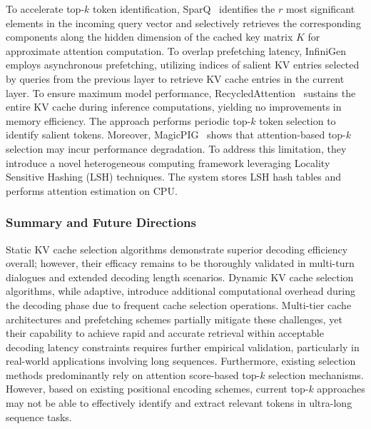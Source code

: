 To accelerate top-$k$ token identification, SparQ~\cite{DBLP:conf/icml/RibarCHBLO24} identifies 
the $r$ most significant elements in the incoming query vector and selectively retrieves 
the corresponding components along the hidden dimension of the cached key matrix $K$ for 
approximate attention computation.
To overlap prefetching latency, InfiniGen~\cite{lee2024infinigenefficientgenerativeinference} employs 
asynchronous prefetching, utilizing indices of salient KV entries selected by queries from 
the previous layer to retrieve KV cache entries in the current layer.
To ensure maximum model performance, RecycledAttention~\cite{xu2024recycledattentionefficientinference} sustains the 
entire KV cache during inference computations, yielding no improvements in memory efficiency. The approach performs periodic top-$k$ token selection to identify salient tokens.
Moreover, MagicPIG~\cite{DBLP:journals/corr/abs-2410-16179} shows that attention-based top-$k$ selection may incur performance degradation. 
To address this limitation, they introduce a novel heterogeneous computing framework leveraging Locality Sensitive Hashing (LSH) techniques. 
The system stores LSH hash tables and performs attention estimation on CPU.

\subsubsection{Summary and Future Directions} 
Static KV cache selection algorithms demonstrate superior decoding efficiency overall; however, 
their efficacy remains to be thoroughly validated in multi-turn dialogues and extended decoding 
length scenarios. Dynamic KV cache selection algorithms, while adaptive, introduce additional 
computational overhead during the decoding phase due to frequent cache selection operations.
Multi-tier cache architectures and prefetching schemes partially mitigate these challenges, 
yet their capability to achieve rapid and accurate retrieval within acceptable decoding latency 
constraints requires further empirical validation, particularly in real-world applications involving 
long sequences. Furthermore, existing selection methods predominantly rely on attention score-based top-$k$ 
selection mechanisms. 
However, based on existing positional encoding schemes, current top-$k$ approaches may not be able to effectively 
identify and extract relevant tokens in ultra-long sequence tasks.







